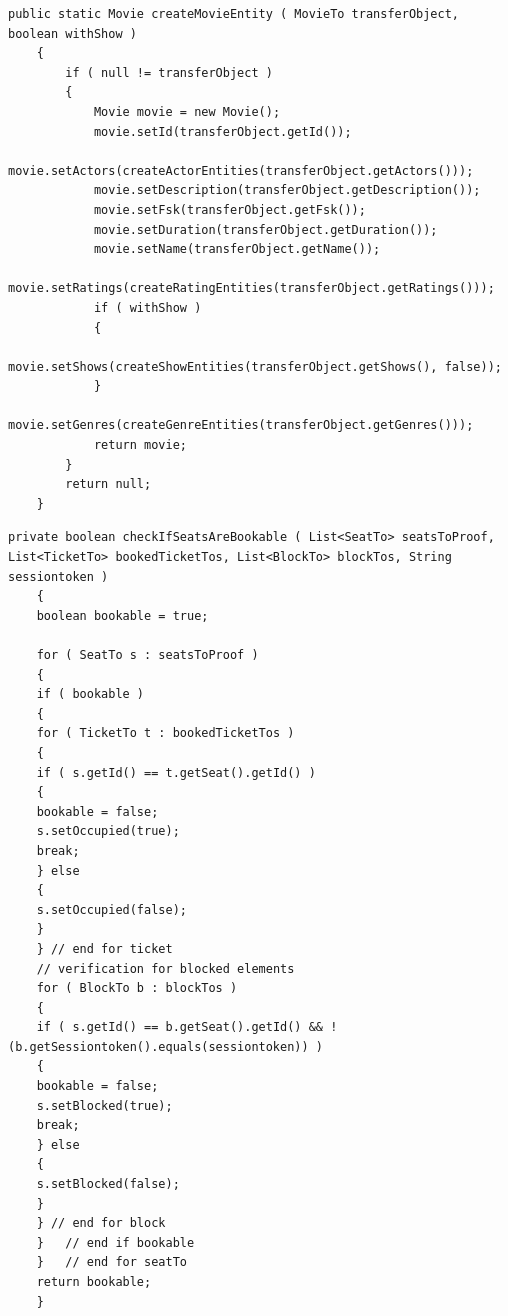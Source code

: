 \begin{minipage}{\linewidth}
	\begin{lstlisting}[style=lstJava]
	public static Movie createMovieEntity ( MovieTo transferObject, boolean withShow )
	{
		if ( null != transferObject )
		{
			Movie movie = new Movie();
			movie.setId(transferObject.getId());
			movie.setActors(createActorEntities(transferObject.getActors()));
			movie.setDescription(transferObject.getDescription());
			movie.setFsk(transferObject.getFsk());
			movie.setDuration(transferObject.getDuration());
			movie.setName(transferObject.getName());
			movie.setRatings(createRatingEntities(transferObject.getRatings()));
			if ( withShow )
			{
				movie.setShows(createShowEntities(transferObject.getShows(), false));
			}
			movie.setGenres(createGenreEntities(transferObject.getGenres()));
			return movie;
		}
		return null;
	}
	\end{lstlisting}
	\label{lst:ToToEntityHelper_movie}
\end{minipage}

\begin{minipage}{\linewidth}
	\begin{lstlisting}[style=lstJava]
	private boolean checkIfSeatsAreBookable ( List<SeatTo> seatsToProof, List<TicketTo> bookedTicketTos, List<BlockTo> blockTos, String sessiontoken )
	{
	boolean bookable = true;
	
	for ( SeatTo s : seatsToProof )
	{
	if ( bookable )
	{
	for ( TicketTo t : bookedTicketTos )
	{
	if ( s.getId() == t.getSeat().getId() )
	{
	bookable = false;
	s.setOccupied(true);
	break;
	} else
	{
	s.setOccupied(false);
	}
	} // end for ticket
	// verification for blocked elements
	for ( BlockTo b : blockTos )
	{
	if ( s.getId() == b.getSeat().getId() && !(b.getSessiontoken().equals(sessiontoken)) )
	{
	bookable = false;
	s.setBlocked(true);
	break;
	} else
	{
	s.setBlocked(false);
	}
	} // end for block
	}	// end if bookable
	}	// end for seatTo
	return bookable;
	}
	\end{lstlisting}
	\label{lst:Angang_Prüfung_ob_Reservierung_möglich}
\end{minipage}

